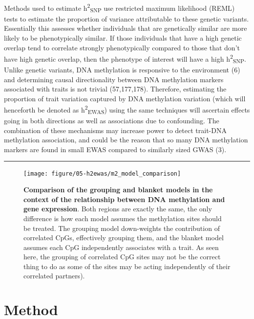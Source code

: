 \documentclass[11pt,oneside]{bristolthesis}
\begin{document}
Methods used to estimate h\textsuperscript{2}\textsubscript{SNP} use restricted maximum likelihood (REML) tests to estimate the proportion of variance attributable to these genetic variants. Essentially this assesses whether individuals that are genetically similar are more likely to be phenotypically similar. If those individuals that have a high genetic overlap tend to correlate strongly phenotypically compared to those that don't have high genetic overlap, then the phenotype of interest will have a high h\textsuperscript{2}\textsubscript{SNP}. Unlike genetic variants, DNA methylation is responsive to the environment (6) and determining causal directionality between DNA methylation markers associated with traits is not trivial (57,177,178). Therefore, estimating the proportion of trait variation captured by DNA methylation variation (which will henceforth be denoted as h\textsuperscript{2}\textsubscript{EWAS}) using the same techniques will ascertain effects going in both directions as well as associations due to confounding. The combination of these mechanisms may increase power to detect trait-DNA methylation association, and could be the reason that so many DNA methylation markers are found in small EWAS compared to similarly sized GWAS (3).
\begin{center}\rule{0.5\linewidth}{0.5pt}\end{center}




\begin{figure}

{\centering \texttt{[image: figure/05-h2ewas/m2\_model\_comparison]} 

}

\caption[Comparison of the grouping and blanket models in the context of the relationship between DNA methylation and gene expression]{\textbf{Comparison of the grouping and blanket models in the context of the relationship between DNA methylation and gene expression}. Both regions are exactly the same, the only difference is how each model assumes the methylation sites should be treated. The grouping model down-weights the contribution of correlated CpGs, effectively grouping them, and the blanket model assumes each CpG independently associates with a trait. As seen here, the grouping of correlated CpG sites may not be the correct thing to do as some of the sites may be acting independently of their correlated partners).}\label{fig:h2ewas-model-comp}
\end{figure}
\hypertarget{method-05}{%
\section{Method}\label{method-05}}
\end{document}

